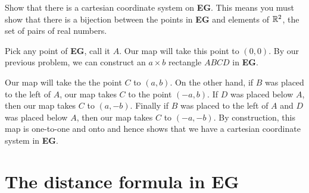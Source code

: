\documentclass{ximera}
\begin{document}
\begin{question}
Show that there is a cartesian coordinate system on \textbf{EG}. This
means you must show that there is a bijection between the points in
\textbf{EG} and elements of $\mathbb R^2$, the set of pairs of real numbers.
\begin{solution}
\begin{freeResponse}
Pick any point of \textbf{EG}, call it $A$. Our map will take this
point to $(0,0)$. By our previous problem, we can construct an
$a\times b$ rectangle $ABCD$ in \textbf{EG}.
\begin{image}
\end{image}
Our map will take the the point $C$ to $(a,b)$. On the other hand, if
$B$ was placed to the left of $A$, our map takes $C$ to the point
$(-a,b)$. If $D$ was placed below $A$, then our map takes $C$ to
$(a,-b)$. Finally if $B$ was placed to the left of $A$ and $D$ was
placed below $A$, then our map takes $C$ to $(-a,-b)$.  By
construction, this map is one-to-one and onto and hence shows that we
have a cartesian coordinate system in \textbf{EG}.
\end{freeResponse}
\end{solution}
\end{question}


\section*{The distance formula in \textbf{EG}}
\end{document}

